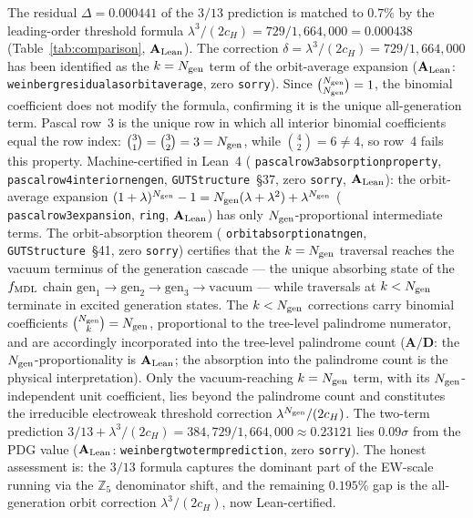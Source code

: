 \documentclass[11pt]{article}
\theoremstyle{remark}
\newcommand{\Ngen}{N_{\rm gen}}
\newcommand{\cH}{c_H}
\newcommand{\lean}[1]{%
  \penalty-100
  \begingroup\def\_{\textunderscore\allowbreak}\texttt{#1}\endgroup}
\newcommand{\CatAL}{\ensuremath{\textbf{A}_{\rm Lean}}}
\newcommand{\CatAD}{\textbf{A/D}}
\begin{document}
The residual $\Delta = 0.000441$ of the $3/13$ prediction is matched to $0.7\%$ by
the leading-order threshold formula $\lambda^3/(2\cH) = 729/1{,}664{,}000 = 0.000438$
(Table~\ref{tab:comparison}, $\CatAL$).
The correction $\delta = \lambda^3/(2\cH) = 729/1{,}664{,}000$ has been identified as the
$k = \Ngen$ term of the orbit-average expansion
($\CatAL$: \lean{weinberg\_residual\_as\_orbit\_average}, zero \texttt{sorry}).
Since $\binom{\Ngen}{\Ngen} = 1$, the binomial coefficient does not modify the formula,
confirming it is the unique all-generation term.
Pascal row~3 is the unique row in which all interior binomial coefficients equal the row
index: $\binom{3}{1} = \binom{3}{2} = 3 = \Ngen$, while $\binom{4}{2} = 6 \neq 4$,
so row~4 fails this property.
Machine-certified in Lean~4 (\lean{pascal\_row3\_absorption\_property},
\lean{pascal\_row4\_interior\_ne\_ngen}, \texttt{GUTStructure}~\S37, zero \texttt{sorry},
$\CatAL$): the orbit-average expansion
$(1+\lambda)^{\Ngen} - 1 = \Ngen(\lambda + \lambda^2) + \lambda^{\Ngen}$
(\lean{pascal\_row3\_expansion}, \lean{ring}, $\CatAL$)
has only $\Ngen$-proportional intermediate terms.
The orbit-absorption theorem (\lean{orbit\_absorption\_at\_ngen},
\texttt{GUTStructure}~\S41, zero \texttt{sorry}) certifies that the $k = \Ngen$
traversal reaches the vacuum terminus of the generation cascade --- the unique
absorbing state of the $f_{\rm MDL}$ chain
$\mathrm{gen}_1\!\to\!\mathrm{gen}_2\!\to\!\mathrm{gen}_3\!\to\!\mathrm{vacuum}$ ---
while traversals at $k < \Ngen$ terminate in excited generation states.
The $k < \Ngen$ corrections carry binomial coefficients
$\binom{\Ngen}{k} = \Ngen$, proportional to the tree-level palindrome numerator,
and are accordingly incorporated into the tree-level palindrome count
($\CatAD$: the $\Ngen$-proportionality is $\CatAL$; the absorption into the
palindrome count is the physical interpretation).
Only the vacuum-reaching $k = \Ngen$ term, with its $\Ngen$-independent unit
coefficient, lies beyond the palindrome count and constitutes the irreducible
electroweak threshold correction $\lambda^{\Ngen}/(2\cH)$.
The two-term prediction $3/13 + \lambda^3/(2\cH) = 384{,}729/1{,}664{,}000 \approx 0.23121$
lies $0.09\sigma$ from the PDG value
($\CatAL$: \lean{weinberg\_two\_term\_prediction}, zero \texttt{sorry}).
The honest assessment is: the $3/13$ formula captures the dominant part of the EW-scale
running via the $\mathbb{Z}_5$ denominator shift, and the remaining $0.195\%$ gap is
the all-generation orbit correction $\lambda^3/(2\cH)$, now Lean-certified.
\end{document}
